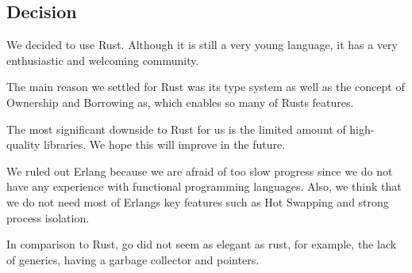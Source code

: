 \subsection{Decision}
We decided to use Rust. Although it is still a very young language, it has a very enthusiastic and welcoming community.

The main reason we settled for Rust was its type system as well as the concept of Ownership and Borrowing as, which enables so many of Rusts features.

The most significant downside to Rust for us is the limited amount of high-quality libraries. We hope this will improve in the future.

We ruled out Erlang because we are afraid of too slow progress since we do not have any experience with functional programming languages. Also, we think that we do not need most of Erlangs key features such as Hot Swapping and strong process isolation.

In comparison to Rust, go did not seem as elegant as rust, for example, the lack of generics, having a garbage collector and pointers.